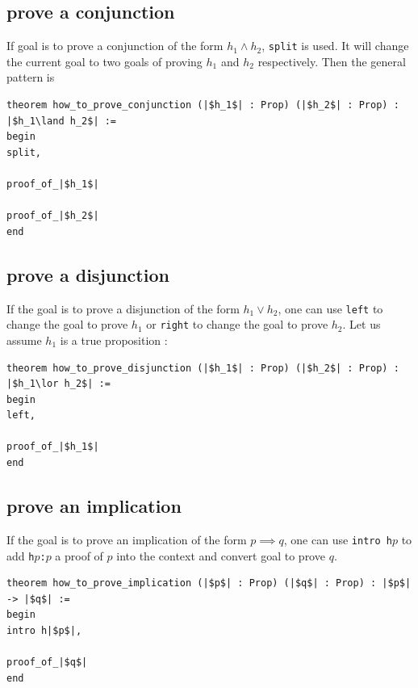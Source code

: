 \documentclass{report}
\theoremstyle{definition}
\begin{document}
\subsection*{prove a conjunction}\label{lean:conj}
If goal is to prove a conjunction of the form $h_1 \land h_2$, {\tt \small split} is used. It will change the current goal to two goals of proving $h_1$ and $h_2$ respectively. Then the general pattern is

\begin{verbatim}
theorem how_to_prove_conjunction (|$h_1$| : Prop) (|$h_2$| : Prop) : |$h_1\land h_2$| :=
begin
split,

proof_of_|$h_1$|

proof_of_|$h_2$|
end
\end{verbatim}


\subsection{prove a disjunction}\label{lean:disjun}
If the goal is to prove a disjunction of the form $h_1 \lor h_2$, one can use {\tt \small left} to change the goal to prove $h_1$ or {\tt \small right} to change the goal to prove $h_2$. Let us assume $h_1$ is a true proposition :

\begin{verbatim}
theorem how_to_prove_disjunction (|$h_1$| : Prop) (|$h_2$| : Prop) : |$h_1\lor h_2$| :=
begin
left,
  
proof_of_|$h_1$|
end
\end{verbatim}


\subsection{prove an implication}\label{lean:imp}
If the goal is to prove an implication of the form $p \implies q$, one can use {\tt \small intro h$p$} to add {\tt \small h$p$:$p$} a proof of $p$ into the context and convert goal to prove $q$.

\begin{verbatim}
theorem how_to_prove_implication (|$p$| : Prop) (|$q$| : Prop) : |$p$| -> |$q$| :=
begin
intro h|$p$|,
  
proof_of_|$q$|
end
\end{verbatim}
\end{document}
